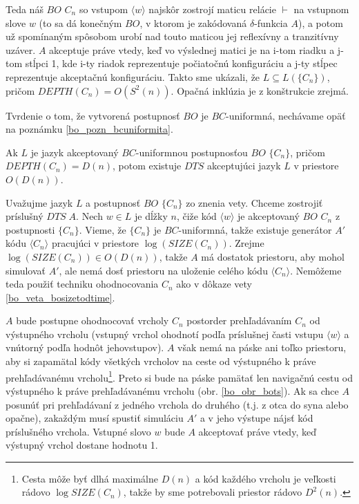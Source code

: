 {\begin{dokaz}
  Teda náš $BO$ $C_n$ so vstupom $\langle w\rangle$ najskôr zostrojí
  maticu relácie $\vdash$ na vstupnom slove $w$ (to sa dá konečným
  $BO$, v ktorom je zakódovaná $\delta$-funkcia $A$), a potom už
  spomínaným spôsobom urobí nad touto maticou jej reflexívny a
  tranzitívny uzáver. $A$ akceptuje práve vtedy, keď vo výslednej
  matici je na i-tom riadku a j-tom stĺpci 1, kde i-ty riadok
  reprezentuje počiatočnú konfiguráciu a j-ty stĺpec reprezentuje
  akceptačnú konfiguráciu. Takto sme ukázali, že $L\subseteq L(\{
  C_n\})$, pričom $DEPTH(C_n)=O(S^2(n))$. Opačná inklúzia je z
  konštrukcie zrejmá.

  Tvrdenie o tom, že vytvorená postupnosť $BO$ je $BC$-uniformná,
  nechávame opäť na poznámku \ref{bo_pozn_bcuniformita}.
\end{dokaz}

\begin{veta}
  \label{bo_veta_bodepthtodspace}

  Ak $L$ je jazyk akceptovaný $BC$-uniformnou postupnosťou $BO$ $\{
  C_n\}$, pričom\linebreak $DEPTH(C_n)=D(n)$, potom existuje $DTS$
  akceptujúci jazyk $L$ v priestore $O(D(n))$.
\end{veta}

\begin{dokaz}
  Uvažujme jazyk $L$ a postupnosť $BO$ $\{ C_n\}$ zo znenia vety.
  Chceme zostrojiť príslušný $DTS\;A$. Nech $w\in L$ je dĺžky $n$, čiže
  kód $\langle w\rangle$ je akceptovaný $BO$ $C_n$ z postupnosti $\{
  C_n\}$. Vieme, že $\{ C_n\}$ je $BC$-uniformná, takže existuje
  generátor $A'$ kódu $\langle C_n\rangle$ pracujúci v priestore
  $\log (SIZE(C_n))$. Zrejme $\log (SIZE(C_n))\in O(D(n))$, takže $A$ má
  dostatok priestoru, aby mohol simulovať $A'$, ale nemá dosť
  priestoru na uloženie celého kódu $\langle C_n\rangle$. Nemôžeme
  teda použiť techniku ohodnocovania $C_n$ ako v dôkaze vety
  \ref{bo_veta_bosizetodtime}.

  $A$ bude postupne ohodnocovať vrcholy $C_n$ postorder
  prehľadávaním $C_n$ od výstupného vrcholu (vstupný vrchol ohodnotí
  podľa príslušnej časti vstupu $\langle w\rangle$ a vnútorný podľa
  hodnôt jeho\linebreak vstupov). $A$ však nemá na páske ani toľko
  priestoru, aby si zapamätal kódy všetkých vrcholov na ceste od
  výstupného k práve prehľadávanému vrcholu\footnote{Cesta môže byť
  dlhá maximálne $D(n)$ a kód každého vrcholu je veľkosti rádovo
  $\log SIZE(C_n)$, takže by sme potrebovali priestor rádovo $D^2(n)$.}. Preto
  si bude na páske pamätať len navigačnú cestu od výstupného k práve
  prehľadávanému vrcholu (obr. \ref{bo_obr_bots}). Ak sa chce $A$ posunúť pri
  prehľadávaní z jedného vrchola do druhého (t.j. z otca do syna
  alebo opačne), zakaždým musí spustiť simuláciu $A'$ a v jeho
  výstupe nájsť kód príslušného vrchola. Vstupné slovo $w$ bude $A$
  akceptovať práve vtedy, keď výstupný vrchol dostane hodnotu 1.


\end{dokaz}}
